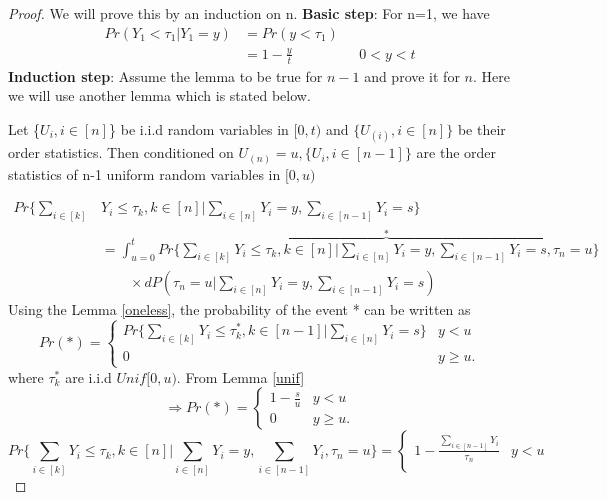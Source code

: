 \documentclass[a4paper,english,12pt]{article}
\begin{document}
\begin{proof}
We will prove this by an induction on n.
\textbf{Basic step}: For n=1, we have\\
\begin{align*}
Pr(Y_1 < \tau_1 | Y_1=y) &= Pr(y < \tau_1)\\
 &=1-\frac{y}{t} \hspace{2cm} 0<y<t
\end{align*}
\textbf{Induction step}: Assume the lemma to be true for $n-1$ and prove it for $n$. Here we will use another lemma which is stated below.
\begin{lem}\label{oneless}
	Let \{$U_i,i \in[n]$\} be i.i.d random variables in $[0,t)$ and $\{U_{(i)},i \in [n]\}$ be their order statistics. Then conditioned on $U_{(n)}=u,\{U_i,i \in[n-1]\}$ are the order statistics of n-1 uniform random variables in $[0,u)$
\end{lem}
\begin{align*}
Pr\Bigg\{\sum_{i\in [k]}&Y_i \leq \tau_k,k\in [n] \Big|\sum_{i\in [n]}Y_i=y, \sum_{i\in [n-1]}Y_i=s \Bigg\}\\
& = \int_{u=0}^{t} Pr\Bigg\{\overbrace{\sum_{i\in [k]}Y_i \leq \tau_k,k\in [n] \Big|\sum_{i\in [n]}Y_i=y,\sum_{i\in [n-1]}Y_i=s, \tau_n=u }^{*}\Bigg\}\\ 
& \qquad \times dP(\tau_n=u |\sum_{i\in [n]}Y_i=y,\sum_{i\in [n-1]}Y_i=s)
\end{align*}
Using the Lemma \ref{oneless}, the probability of the event * can be written as
\begin{equation*}
Pr(*) = 
\begin{cases}
Pr\Big\{\sum_{i\in [k]}Y_i \leq \tau_k^*,k \in [n-1] \Big| \sum_{i\in [n]}Y_i=s \Big\}  & y < u\\
0 & y \geq u.
\end{cases}
\end{equation*}
where $\tau_k^*$ are i.i.d $Unif[0,u)$. From Lemma \ref{unif}
\begin{equation*}
\Rightarrow  Pr(*) = 
\begin{cases}
1-\frac{s}{u} & y < u\\
0 & y \geq u.
\end{cases}
\end{equation*}
\begin{equation*}
Pr\Bigg\{\sum_{i\in [k]}Y_i \leq \tau_k,k\in [n] \Big|\sum_{i\in [n]}Y_i=y,\sum_{i\in [n-1]}Y_i, \tau_n=u\Bigg\}=
\begin{cases}
1-\frac{\sum_{i \in [n-1]}Y_i}{\tau_n}	&y<u\\

\end{cases}
\end{equation*}
\end{proof}
\end{document}
